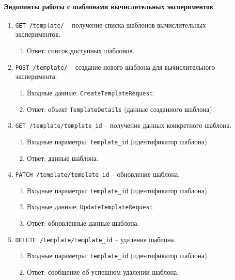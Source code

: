 \paragraph{Эндпоинты работы с шаблонами вычислительных экспериментов}

\begin{enumerate}
    \item \texttt{GET /template/} -- получение списка шаблонов вычислительных экспериментов.
    \begin{enumerate}[label=\arabic{enumi}.\arabic*.]
        \item Ответ: список доступных шаблонов.
    \end{enumerate}

    \item \texttt{POST /template/} -- создание нового шаблона для вычислительного эксперимента.
    \begin{enumerate}[label=\arabic{enumi}.\arabic*.]
        \item Входные данные: \texttt{CreateTemplateRequest}.
        \item Ответ: объект \texttt{TemplateDetails} (данные созданного шаблона).
    \end{enumerate}

    \item \texttt{GET /template/{template\_id}} -- получение данных конкретного шаблона.
    \begin{enumerate}[label=\arabic{enumi}.\arabic*.]
        \item Входные параметры: \texttt{template\_id} (идентификатор шаблона).
        \item Ответ: данные шаблона.
    \end{enumerate}

    \item \texttt{PATCH /template/{template\_id}} -- обновление шаблона.
    \begin{enumerate}[label=\arabic{enumi}.\arabic*.]
        \item Входные параметры: \texttt{template\_id} (идентификатор шаблона).
        \item Входные данные: \texttt{UpdateTemplateRequest}.
        \item Ответ: обновленные данные шаблона.
    \end{enumerate}

    \item \texttt{DELETE /template/{template\_id}} -- удаление шаблона.
    \begin{enumerate}[label=\arabic{enumi}.\arabic*.]
        \item Входные параметры: \texttt{template\_id} (идентификатор шаблона).
        \item Ответ: сообщение об успешном удалении шаблона.
    \end{enumerate}
\end{enumerate}

